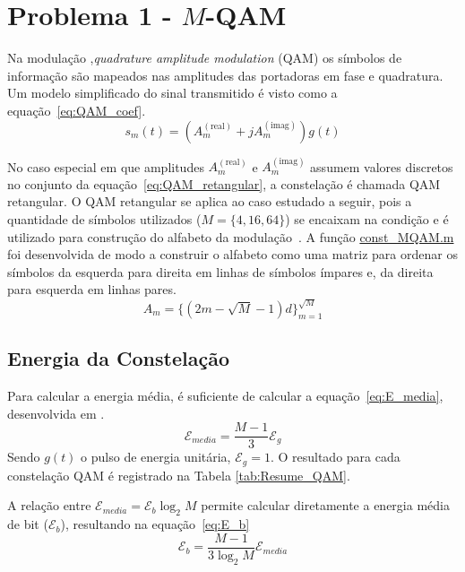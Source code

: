 \section{Problema 1 - \texorpdfstring{$M$}{M}-QAM}

Na modulação ,\textit{quadrature amplitude modulation} (QAM) os símbolos de informação são mapeados nas amplitudes das portadoras em fase e quadratura. Um modelo simplificado do sinal transmitido é visto como a equação~\ref{eq:QAM_coef}.
\begin{equation}
    s_m(t) = ( A_m^{(\text{real})} + j A_m^{(\text{imag})}) g(t)
    \label{eq:QAM_coef}
\end{equation}

No caso especial em que amplitudes $A_m^{(\text{real})}$ e $A_m^{(\text{imag})}$ assumem valores discretos no conjunto da equação~\ref{eq:QAM_retangular}, a constelação é chamada QAM retangular. O QAM retangular se aplica ao caso estudado a seguir, pois a quantidade de símbolos utilizados ($M = \{4, 16, 64\}$) se encaixam na condição e é utilizado para construção do alfabeto da modulação~\cite{Cecilio}. A função \href{https://raw.githubusercontent.com/lucasabdalah/Courses-HWs/SCD/Sistemas%20de%20Comunicacoes%20Digitais/matlab/problema1/const_MQAM.m}{const\_MQAM.m} foi desenvolvida de modo a construir o alfabeto como uma matriz para ordenar os símbolos da esquerda para direita em linhas de símbolos ímpares e, da direita para esquerda em linhas pares.
\begin{equation}
    A_m = \{(2m -\sqrt{M} - 1)d \}_{m=1}^{\sqrt{M}}
    \label{eq:QAM_retangular}
\end{equation}

\subsection{Energia da Constelação} 

Para calcular a energia média, é suficiente de calcular a equação~\ref{eq:E_media}, desenvolvida em \cite{Cecilio,Proakis}.
\begin{equation}
    \mathcal{E}_{media} = \frac{M-1}{3} \mathcal{E}_g
    \label{eq:E_media}
\end{equation}
Sendo $g(t)$ o pulso de energia unitária, $\mathcal{E}_g = 1$. O resultado para cada constelação QAM é registrado na Tabela \ref{tab:Resume_QAM}.

A relação entre $\mathcal{E}_{media} = \mathcal{E}_b \log_2{M}$ permite calcular diretamente a energia média de bit ($\mathcal{E}_b$), resultando na equação~\ref{eq:E_b}
\begin{equation}
    \mathcal{E}_b = \frac{M-1}{3\log_2 M} \mathcal{E}_{media}
    \label{eq:E_b}
\end{equation}

